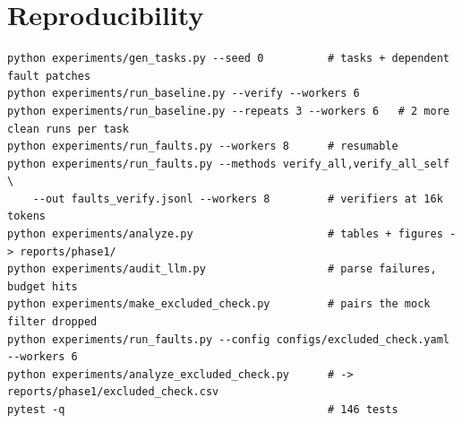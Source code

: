 \documentclass[11pt]{article}
\begin{document}
\section{Reproducibility}
\begin{lstlisting}
python experiments/gen_tasks.py --seed 0          # tasks + dependent fault patches
python experiments/run_baseline.py --verify --workers 6
python experiments/run_baseline.py --repeats 3 --workers 6   # 2 more clean runs per task
python experiments/run_faults.py --workers 8      # resumable
python experiments/run_faults.py --methods verify_all,verify_all_self \
    --out faults_verify.jsonl --workers 8         # verifiers at 16k tokens
python experiments/analyze.py                     # tables + figures -> reports/phase1/
python experiments/audit_llm.py                   # parse failures, budget hits
python experiments/make_excluded_check.py         # pairs the mock filter dropped
python experiments/run_faults.py --config configs/excluded_check.yaml --workers 6
python experiments/analyze_excluded_check.py      # -> reports/phase1/excluded_check.csv
pytest -q                                         # 146 tests
\end{lstlisting}
\end{document}

